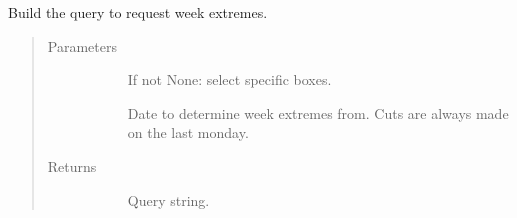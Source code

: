 \documentclass[letterpaper,10pt,english]{sphinxmanual}
\begin{document}
\begin{fulllineitems}
\label{\detokenize{autoapi/src/utils/snowflake/index:src.utils.snowflake.make_week_extremes_query}}
Build the query to request week extremes.
\begin{quote}\begin{description}
\item[{Parameters}] \leavevmode\begin{description}
\item[{}] \leavevmode{[}\sphinxhref{https://docs.python.org/3/library/stdtypes.html\#list}{\sphinxcode{\sphinxupquote{list}}}{]}
If not None: select specific boxes.

\item[{}] \leavevmode
Date to determine week extremes from. Cuts are always made on the last monday.

\end{description}

\item[{Returns}] \leavevmode\begin{description}
\item[{}] \leavevmode
Query string.

\end{description}

\end{description}\end{quote}

\end{fulllineitems}

\end{document}
